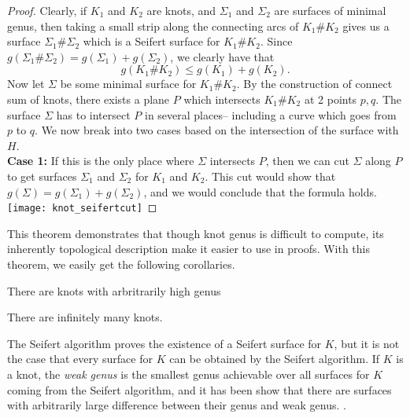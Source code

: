 \begin{proof}
Clearly, if $K_1$ and $K_2$ are knots, and $\Sigma_1$ and $\Sigma_2$ are surfaces of minimal genus, then taking a small strip along the connecting arcs of $K_1\#K_2$ gives us a surface $\Sigma_1\# \Sigma_2$ which is a Seifert surface for $K_1\#K_2$. Since $g(\Sigma_1\#\Sigma_2)=g(\Sigma_1)+g(\Sigma_2)$, we clearly have that 
\[g(K_1\#K_2)\leq g(K_1)+g(K_2).\]
Now let $\Sigma$ be some minimal surface for $K_1\# K_2$. By the construction of connect sum of knots, there exists a plane $P$ which intersects $K_1\# K_2$ at 2 points $p, q$. The surface $\Sigma$ has to intersect $P$ in several places-- including a curve which goes from $p$ to $q$. We now break into two cases based on the intersection of the surface with $H$.\\ 

\noindent \textbf{Case 1:} If this is the only place where $\Sigma$ intersects $P$, then we can cut $\Sigma$ along $P$ to get surfaces $\Sigma_1$ and $\Sigma_2$ for $K_1$ and $K_2$. This cut would show that $g(\Sigma)=g(\Sigma_1)+g(\Sigma_2)$, and we would conclude that the formula holds.\\
{\texttt{[image: knot\_seifertcut]}}
\end{proof}
This theorem demonstrates that though knot genus is difficult to compute, its inherently topological description make it easier to use in proofs. With this theorem, we easily get the following corollaries. 
\begin{corollary}
There are knots with arbritrarily high genus
\end{corollary}
\begin{corollary}
There are infinitely many knots. 
\end{corollary}
\begin{remark}
The Seifert algorithm proves the existence of a Seifert surface for $K$, but it is not the case that every surface for $K$ can be obtained by the Seifert algorithm. If $K$ is a knot, the \emph{weak genus} is the smallest genus achievable over all surfaces for $K$ coming from the Seifert algorithm, and it has been show that there are surfaces with arbitrarily large difference between their genus and weak genus. \cite{stoimenov}.
\end{remark}
